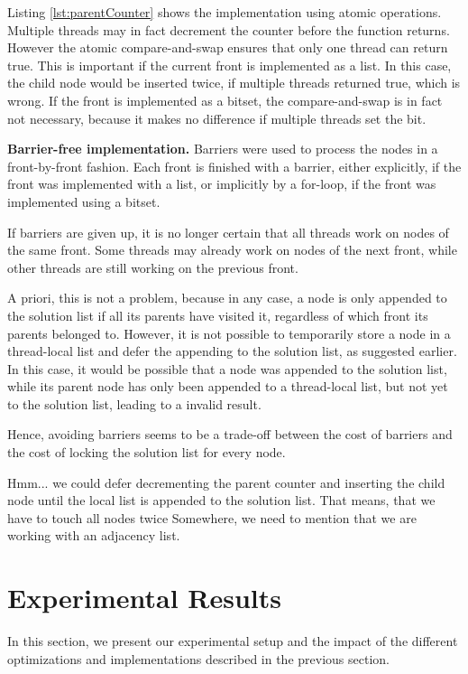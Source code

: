 \documentclass[letterpaper]{article}
\newcommand{\mypar}[1]{{\bf #1.}}
\begin{document}
Listing \ref{lst:parentCounter} shows the implementation using atomic operations. Multiple threads may in fact decrement the counter before the function returns.
However the atomic compare-and-swap ensures that only one thread can return true. This is important if the current front is implemented as a list.
In this case, the child node would be inserted twice, if multiple threads returned true, which is wrong.
If the front is implemented as a bitset, the compare-and-swap is in fact not necessary, because it makes no difference if multiple threads set the bit.

\mypar{Barrier-free implementation}
Barriers were used to process the nodes in a front-by-front fashion.
Each front is finished with a barrier, either explicitly, if the front was implemented with a list, or implicitly by a for-loop, if the front was implemented using a bitset.

If barriers are given up, it is no longer certain that all threads work on nodes of the same front.
Some threads may already work on nodes of the next front, while other threads are still working on the previous front.

A priori, this is not a problem, because in any case, a node is only appended to the solution list if all its parents have visited it, regardless of which front its parents belonged to.
However, it is not possible to temporarily store a node in a thread-local list and defer the appending to the solution list, as suggested earlier.
In this case, it would be possible that a node was appended to the solution list, while its parent node has only been appended to a thread-local list, but not yet to the solution list, leading to a invalid result.

Hence, avoiding barriers seems to be a trade-off between the cost of barriers and the cost of locking the solution list for every node.

\begin{invisible}
Hmm... we could defer decrementing the parent counter and inserting the child node until the local list is appended to the solution list. That means, that we have to touch all nodes twice
Somewhere, we need to mention that we are working with an adjacency list.
\end{invisible}

\section{Experimental Results}\label{sec:exp}
In this section, we present our experimental setup and the impact of the different optimizations and implementations described in the previous section.
\end{document}
